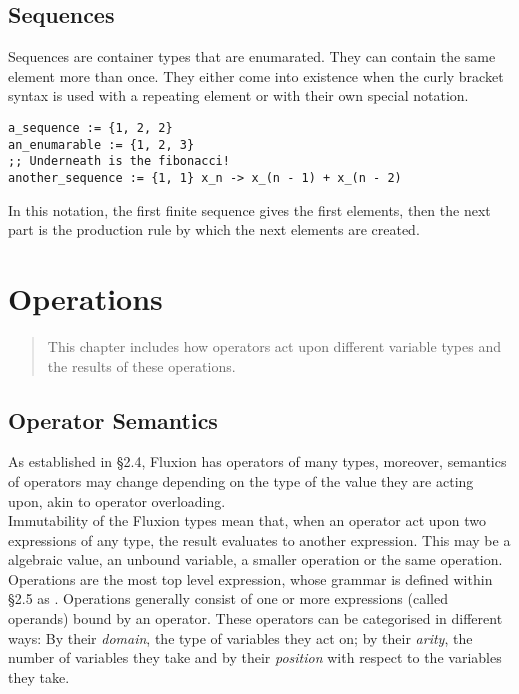 \documentclass[11pt,a4paper]{book}
\begin{document}
\section{Sequences}

Sequences are container types that are enumarated. They can contain the same element more than once. They either come into existence when the curly bracket syntax is used with a repeating element or with their own special notation.

\begin{lstlisting}
a_sequence := {1, 2, 2}
an_enumarable := {1, 2, 3}
;; Underneath is the fibonacci!
another_sequence := {1, 1} x_n -> x_(n - 1) + x_(n - 2)
\end{lstlisting}

In this notation, the first finite sequence gives the first elements, then the next part is the production rule by which the next elements are created.

\chapter{Operations}
\vspace{1em}
\begin{quotation}
This chapter includes how operators act upon different variable types and the results of these operations.
\end{quotation}
\newpage

\section{Operator Semantics}

As established in \S 2.4, Fluxion has operators of many types, moreover, semantics of operators may change depending on the type of the value they are acting upon, akin to operator overloading.\\

Immutability of the Fluxion types mean that, when an operator act upon two expressions of any type, the result evaluates to another expression. This may be a algebraic value, an unbound variable, a smaller operation or the same operation.\\

Operations are the most top level expression, whose grammar is defined within \S 2.5 as . Operations generally consist of one or more expressions (called operands) bound by an operator. These operators can be categorised in different ways: By their \textit{domain}, the type of variables they act on; by their \textit{arity}, the number of variables they take and by their \textit{position} with respect to the variables they take.\\
\end{document}
